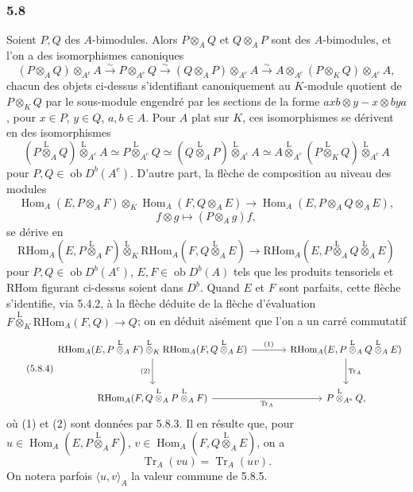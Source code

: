 \documentclass[11pt]{article}
\DeclareMathOperator{\Hom}{Hom}
\newcommand{\ob}{\operatorname{ob}}
\providecommand{\RHom}{\mathrm{RHom}}
\providecommand{\Tr}{\operatorname{Tr}}
\providecommand{\Tr}{\operatorname{Tr}}
\providecommand{\lten}{\overset{\mathrm L}{\otimes}}
\providecommand{\Tr}{\operatorname{Tr}}
\providecommand{\RHom}{\mathrm{RHom}}
\providecommand{\Hom}{\operatorname{Hom}}
\providecommand{\ob}{\operatorname{ob}}
\providecommand{\lten}{\overset{\mathrm L}{\otimes}}
\providecommand{\RHom}{\mathrm R\mathcal{H}om}
\providecommand{\lten}{\overset{\mathrm L}{\otimes}}
\providecommand{\Tr}{\operatorname{Tr}}
\providecommand{\lten}{\overset{\mathrm L}{\otimes}}
\providecommand{\lten}{\overset{\mathrm L}{\otimes}}
\providecommand{\lten}{\overset{\mathrm L}{\otimes}}
\providecommand{\RHom}{\mathrm{RHom}}
\providecommand{\Hom}{\operatorname{Hom}}
\providecommand{\Tr}{\operatorname{Tr}}
\providecommand{\lten}{\overset{\mathrm L}{\otimes}}
\begin{document}
\subsubsection*{5.8}

Soient $P,Q$ des $A$-bimodules. Alors $P\otimes_AQ$ et $Q\otimes_AP$ sont des $A$-bimodules, et l'on a des isomorphismes canoniques
\begin{equation}\tag{5.8.1}
(P\otimes_AQ)\otimes_{A^e}A\xrightarrow{\sim}P\otimes_{A^e}Q\xrightarrow{\sim}(Q\otimes_AP)\otimes_{A^e}A\xrightarrow{\sim}A\otimes_{A^e}(P\otimes_KQ)\otimes_{A^e}A,
\end{equation}
chacun des objets ci-dessus s'identifiant canoniquement au $K$-module quotient de $P\otimes_KQ$ par le sous-module engendré par les sections de la forme $axb\otimes y-x\otimes bya$, pour $x\in P$, $y\in Q$, $a,b\in A$. Pour $A$ plat sur $K$, ces isomorphismes se dérivent en des isomorphismes
\begin{equation}\tag{5.8.2}
(P\lten_AQ)\lten_{A^e}A\simeq P\lten_{A^e}Q\simeq(Q\lten_AP)\lten_{A^e}A\simeq A\lten_{A^e}(P\lten_KQ)\lten_{A^e}A
\end{equation}
pour $P,Q\in\ob D^b(A^e)$. D'autre part, la flèche de composition au niveau des modules
\[
\Hom_A(E,P\otimes_AF)\otimes_K\Hom_A(F,Q\otimes_AE)
\longrightarrow\Hom_A(E,P\otimes_AQ\otimes_AE),
\]
\[
f\otimes g\longmapsto (P\otimes_Ag)f,
\]
se dérive en
\begin{equation}\tag{5.8.3}
\RHom_A(E,P\lten_AF)\lten_K\RHom_A(F,Q\lten_AE)
\longrightarrow\RHom_A(E,P\lten_AQ\lten_AE)
\end{equation}
pour $P,Q\in\ob D^b(A^e)$, $E,F\in\ob D^b(A)$ tels que les produits tensoriels et $\RHom$ figurant ci-dessus soient dans $D^b$. Quand $E$ et $F$ sont parfaits, cette flèche s'identifie, via 5.4.2, à la flèche déduite de la flèche d'évaluation $F\lten_K\RHom_A(F,Q)\to Q$; on en déduit aisément que l'on a un carré commutatif
\begin{equation}\tag{5.8.4}
\begin{tikzcd}[column sep=large,row sep=large]
\RHom_A(E,P\lten_AF)\lten_K\RHom_A(F,Q\lten_AE) \arrow[r,"(1)"] \arrow[d,"(2)"'] & \RHom_A(E,P\lten_AQ\lten_AE) \arrow[d,"\Tr_A"]\\
\RHom_A(F,Q\lten_AP\lten_AF) \arrow[r,"\Tr_A"'] & P\lten_{A^e}Q,
\end{tikzcd}
\end{equation}
où (1) et (2) sont données par 5.8.3. Il en résulte que, pour $u\in\Hom_A(E,P\lten_AF)$, $v\in\Hom_A(F,Q\lten_AE)$, on a
\begin{equation}\tag{5.8.5}
\Tr_A(vu)=\Tr_A(uv).
\end{equation}
On notera parfois $\langle u,v\rangle_A$ la valeur commune de 5.8.5.
\end{document}
